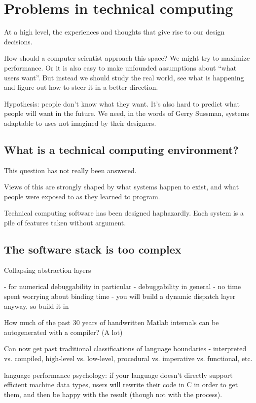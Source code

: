 \chapter{Problems in technical computing}

At a high level, the experiences and thoughts that give rise to our
design decisions.

How should a computer scientist approach this space? We might try to
maximize performance. Or it is also easy to make unfounded assumptions about
``what users want''. But instead we should study the real world, see
what is happening and figure out how to steer it in a better direction.

Hypothesis: people don't know what they want. It's also hard to
predict what people will want in the future. We need, in the words
of Gerry Sussman, systems adaptable to uses not imagined by their
designers.

\section{What is a technical computing environment?}

This question has not really been answered.

Views of this are strongly shaped by what systems happen to exist,
and what people were exposed to as they learned to program.

Technical computing software has been designed haphazardly. Each system
is a pile of features taken without argument.




\section{The software stack is too complex}

Collapsing abstraction layers

- for numerical debuggability in particular
- debuggability in general
- no time spent worrying about binding time
- you will build a dynamic dispatch layer anyway, so build it in


How much of the past 30 years of handwritten Matlab internals can
be autogenerated with a compiler? (A lot)

Can now get past traditional classifications of language boundaries
- interpreted vs. compiled, high-level vs. low-level, procedural vs.
imperative vs. functional, etc.

language performance psychology:
if your language doesn't directly support efficient machine data types,
users will rewrite their code in C in order to get them, and then be
happy with the result (though not with the process).


